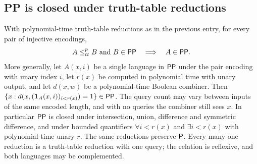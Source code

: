 \begin{result}
\subsection{PP is closed under truth-table reductions}
With polynomial-time truth-table reductions as in the previous entry, for every
pair of injective encodings,
\[
A\le^p_{tt}B\ \text{and}\ B\in\cc{PP}\quad\Longrightarrow\quad A\in\cc{PP}.
\]
More generally, let $A(x,i)$ be a single language in $\mathsf{PP}$ under the pair
encoding with unary index $i$, let $r(x)$ be computed in polynomial time with
unary output, and let $d(x,w)$ be a polynomial-time Boolean combiner. Then
$\{x:d(x,(\mathbf1_A(x,i))_{i<r(x)})=1\}\in\mathsf{PP}$. The query count may vary
between inputs of the same encoded length, and with no queries the combiner
still sees $x$. In particular $\mathsf{PP}$ is closed under intersection, union,
difference and symmetric difference, and under bounded quantifiers
$\forall i<r(x)$ and $\exists i<r(x)$ with polynomial-time unary $r$.
The same reductions preserve $\mathsf{P}$. Every many-one reduction is a
truth-table reduction with one query; the relation is reflexive, and both
languages may be complemented.


\end{result}
